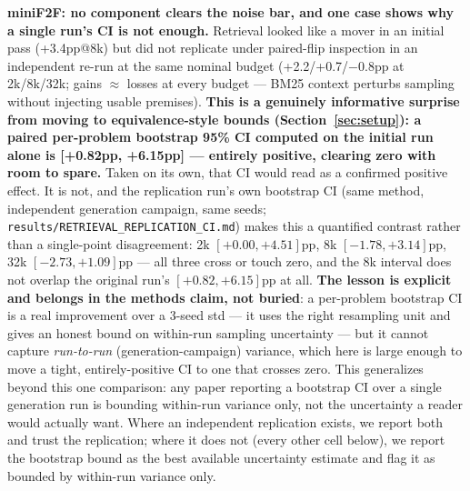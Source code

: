 \documentclass{article}
\begin{document}
\textbf{miniF2F: no component clears the noise bar, and one case shows why a single run's CI is not
enough.} Retrieval looked like a mover in an initial pass (+3.4pp@8k) but did not replicate under
paired-flip inspection in an independent re-run at the same nominal budget (+2.2/+0.7/$-0.8$pp at
2k/8k/32k; gains $\approx$ losses at every budget --- BM25 context perturbs sampling without injecting
usable premises). \textbf{This is a genuinely informative surprise from moving to equivalence-style
bounds (Section~\ref{sec:setup}): a paired per-problem bootstrap 95\% CI computed on the initial run
alone is [+0.82pp, +6.15pp] --- entirely positive, clearing zero with room to spare.} Taken on its own,
that CI would read as a confirmed positive effect. It is not, and the replication run's own bootstrap
CI (same method, independent generation campaign, same seeds; \texttt{results/RETRIEVAL\_REPLICATION\_CI.md})
makes this a quantified contrast rather than a single-point disagreement: 2k
$[+0.00,+4.51]$pp, 8k $[-1.78,+3.14]$pp, 32k $[-2.73,+1.09]$pp --- all three cross or touch zero, and
the 8k interval does not overlap the original run's $[+0.82,+6.15]$pp at all. \textbf{The lesson is
explicit and belongs in the methods claim, not buried}: a per-problem bootstrap CI is a real
improvement over a 3-seed std --- it uses the right resampling unit and gives an honest bound on
within-run sampling uncertainty --- but it cannot capture \emph{run-to-run} (generation-campaign)
variance, which here is large enough to move a tight, entirely-positive CI to one that crosses zero.
This generalizes beyond this one comparison: any paper reporting a bootstrap CI over a single
generation run is bounding within-run variance only, not the uncertainty a reader would actually want.
Where an independent replication exists, we report both and trust the replication; where it does not
(every other cell below), we report the bootstrap bound as the best available uncertainty estimate and
flag it as bounded by within-run variance only.
\end{document}
